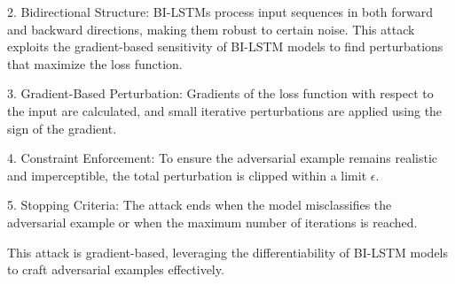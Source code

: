 2. Bidirectional Structure: BI-LSTMs process input sequences in both forward and backward directions, making them robust to certain noise. This attack exploits the gradient-based sensitivity of BI-LSTM models to find perturbations that maximize the loss function.

3. Gradient-Based Perturbation: Gradients of the loss function with respect to the input are calculated, and small iterative perturbations are applied using the sign of the gradient.

4. Constraint Enforcement: To ensure the adversarial example remains realistic and imperceptible, the total perturbation is clipped within a limit $\epsilon$.

5. Stopping Criteria: The attack ends when the model misclassifies the adversarial example or when the maximum number of iterations is reached.

This attack is gradient-based, leveraging the differentiability of BI-LSTM models to craft adversarial examples effectively.
